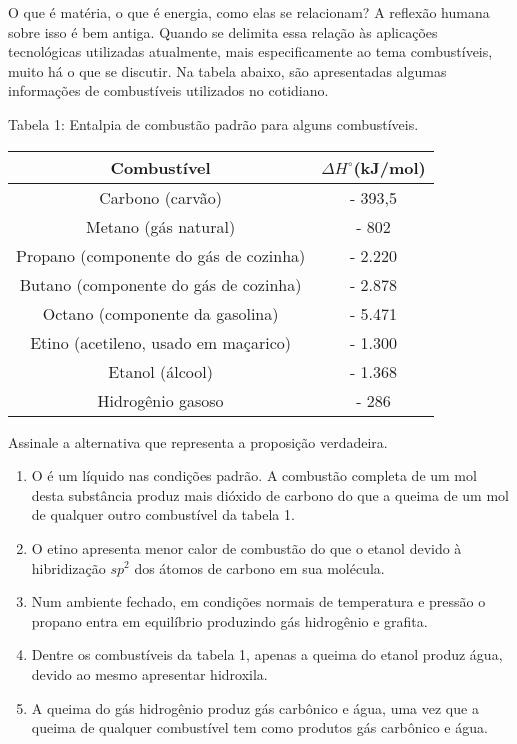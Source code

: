 O que é matéria, o que é energia, como elas se relacionam? A reflexão humana sobre isso é bem antiga. Quando se delimita essa relação às aplicações tecnológicas utilizadas atualmente, mais especificamente ao tema combustíveis, muito há o que se discutir. Na tabela abaixo, são apresentadas algumas informações de combustíveis utilizados no cotidiano.

\begin{center}
Tabela 1: Entalpia de combustão padrão para alguns combustíveis.

\renewcommand{\arraystretch}{1.5}
\begin{tabular}{|c|c|}
	\hline
	Combustível & $\Delta H^\circ$(kJ/mol) \\
	\hline 
	Carbono (carvão) &- 393,5 \\ 
	\hline
	Metano (gás natural) & - 802 \\ 
	\hline
	Propano (componente do gás de cozinha) &  - 2.220 \\
	\hline
	Butano (componente do gás de cozinha) &  - 2.878 \\
	\hline
	Octano (componente da gasolina) & - 5.471 \\
	\hline
	Etino (acetileno, usado em maçarico) &  - 1.300 \\
	\hline
	Etanol (álcool) &  - 1.368 \\
	\hline
	Hidrogênio gasoso &  - 286 \\
	\hline 
\end{tabular}
\end{center}

Assinale a alternativa que representa a proposição verdadeira.

\begin{enumerate}[label = (\alph*)]
	\item  O  é um líquido nas condições padrão. A combustão completa de um mol desta substância produz mais dióxido de carbono do que a queima de um mol de qualquer outro combustível da tabela 1. 
	\item O etino apresenta menor calor de combustão do que o etanol devido à hibridização $sp^2$ dos átomos de carbono em sua molécula.
	\item Num ambiente fechado, em condições normais de temperatura e pressão o propano entra em equilíbrio produzindo gás hidrogênio e grafita. 
	\item  Dentre os combustíveis da tabela 1, apenas a queima do etanol produz água, devido ao mesmo apresentar hidroxila.
	\item A queima do gás hidrogênio produz gás carbônico e água, uma vez que a queima de qualquer combustível tem como produtos gás carbônico e água.
\end{enumerate}
